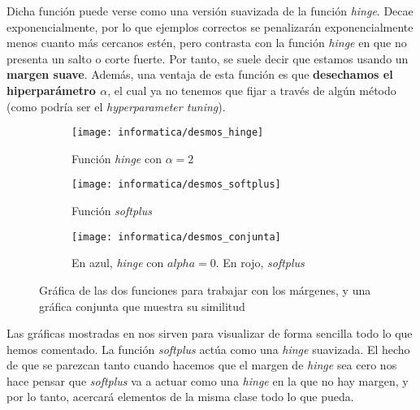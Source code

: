 Dicha función puede verse como una versión suavizada de la función \textit{hinge}. Decae exponencialmente, por lo que ejemplos correctos se penalizarán exponencialmente menos cuanto más cercanos estén, pero contrasta con la función \textit{hinge} en que no presenta un salto o corte fuerte. Por tanto, se suele decir que estamos usando un \textbf{margen suave}. Además, una ventaja de esta función es que \textbf{desechamos el hiperparámetro $\alpha$}, el cual ya no tenemos que fijar a través de algún método (como podría ser el \textit{hyperparameter tuning}).

\begin{figure}[!hbtp]
\centering
    \begin{subfigure}{.5\textwidth}
        \centering
        \texttt{[image: informatica/desmos\_hinge]}
        \caption{Función \textit{hinge} con $\alpha = 2$}
    \end{subfigure}%
    \begin{subfigure}{.5\textwidth}
        \centering
        \texttt{[image: informatica/desmos\_softplus]}
        \caption{Función \textit{softplus}}
    \end{subfigure}

    \begin{subfigure}{.5\textwidth}
        \centering
        \texttt{[image: informatica/desmos\_conjunta]}
        \caption{En azul, \textit{hinge} con $alpha = 0$. En rojo, \textit{softplus}}
    \end{subfigure}


\caption{Gráfica de las dos funciones para trabajar con los márgenes, y una gráfica conjunta que muestra su similitud}
    \label{img:graficas_margenes}
\end{figure}

Las gráficas mostradas en  nos sirven para visualizar de forma sencilla todo lo que hemos comentado. La función \textit{softplus} actúa como una \textit{hinge} suavizada. El hecho de que se parezcan tanto cuando hacemos que el margen de \textit{hinge} sea cero nos hace pensar que \textit{softplus} va a actuar como una \textit{hinge} en la que no hay margen, y por lo tanto, acercará elementos de la misma clase todo lo que pueda.
